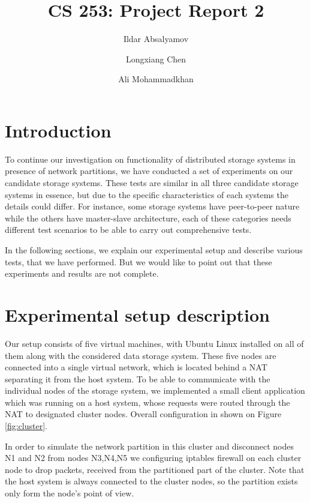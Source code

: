 \documentclass[a4paper]{article}
\title{CS 253: Project Report 2}
\author{Ildar Absalyamov \and Longxiang Chen \and Ali Mohammadkhan}
\begin{document}
\maketitle

\section*{Introduction}

To continue our investigation on functionality of distributed storage systems in presence of network partitions, we have conducted a set of experiments on our candidate storage systems.
These tests are similar in all three candidate storage systems in essence, but due to the specific characteristics of each systems the details could differ. 
For instance, some storage systems have peer-to-peer nature while the others have master-slave architecture, each of these categories needs different test scenarios to be able to carry out comprehensive tests.

In the following sections, we explain our experimental setup and describe various tests, that we have performed. But we would like to point out that these experiments and results are not complete.

\section{Experimental setup description}

Our setup consists of five virtual machines, with Ubuntu Linux installed on all of them along with the considered data storage system. 
These five nodes are connected into a single virtual network, which is located behind a NAT separating it from the host system.
To be able to communicate with the individual nodes of the storage system, we implemented a small client application which was running on a host system, whose requests were routed through the NAT to designated cluster nodes. 
Overall configuration in shown on Figure \ref{fig:cluster}. 

In order to simulate the network partition in this cluster and disconnect nodes N1 and N2 from nodes N3,N4,N5 we configuring iptables firewall on each cluster node to drop packets, received from the partitioned part of the cluster.
Note that the host system is always connected to the cluster nodes, so the partition exists only form the node's point of view.
\end{document}
